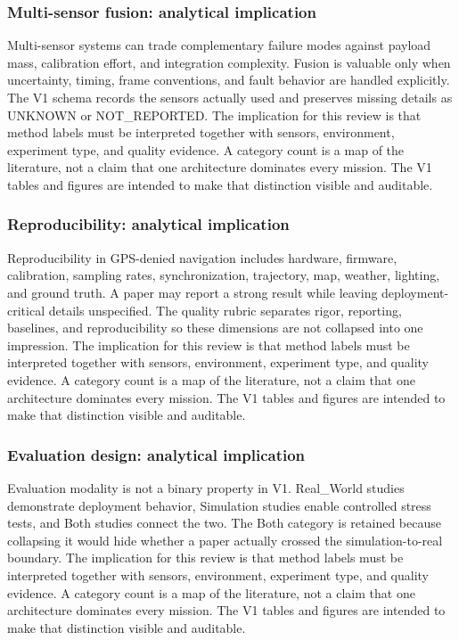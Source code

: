 \documentclass[
  journal,
  10pt]{IEEEtran}
\begin{document}
\subsubsection{Multi-sensor fusion: analytical
implication}\label{multi-sensor-fusion-analytical-implication-2}

Multi-sensor systems can trade complementary failure modes against
payload mass, calibration effort, and integration complexity. Fusion is
valuable only when uncertainty, timing, frame conventions, and fault
behavior are handled explicitly. The V1 schema records the sensors
actually used and preserves missing details as UNKNOWN or NOT\_REPORTED.
The implication for this review is that method labels must be
interpreted together with sensors, environment, experiment type, and
quality evidence. A category count is a map of the literature, not a
claim that one architecture dominates every mission. The V1 tables and
figures are intended to make that distinction visible and auditable.

\subsubsection{Reproducibility: analytical
implication}\label{reproducibility-analytical-implication-2}

Reproducibility in GPS-denied navigation includes hardware, firmware,
calibration, sampling rates, synchronization, trajectory, map, weather,
lighting, and ground truth. A paper may report a strong result while
leaving deployment-critical details unspecified. The quality rubric
separates rigor, reporting, baselines, and reproducibility so these
dimensions are not collapsed into one impression. The implication for
this review is that method labels must be interpreted together with
sensors, environment, experiment type, and quality evidence. A category
count is a map of the literature, not a claim that one architecture
dominates every mission. The V1 tables and figures are intended to make
that distinction visible and auditable.

\subsubsection{Evaluation design: analytical
implication}\label{evaluation-design-analytical-implication-2}

Evaluation modality is not a binary property in V1. Real\_World studies
demonstrate deployment behavior, Simulation studies enable controlled
stress tests, and Both studies connect the two. The Both category is
retained because collapsing it would hide whether a paper actually
crossed the simulation-to-real boundary. The implication for this review
is that method labels must be interpreted together with sensors,
environment, experiment type, and quality evidence. A category count is
a map of the literature, not a claim that one architecture dominates
every mission. The V1 tables and figures are intended to make that
distinction visible and auditable.
\end{document}
